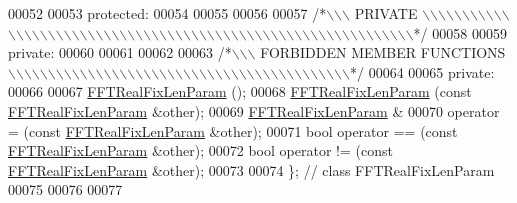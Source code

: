 \begin{DoxyCode}
00052 
00053 \textcolor{keyword}{protected}:
00054 
00055 
00056 
00057 \textcolor{comment}{/*\(\backslash\)\(\backslash\)\(\backslash\) PRIVATE \(\backslash\)\(\backslash\)\(\backslash\)\(\backslash\)\(\backslash\)\(\backslash\)\(\backslash\)\(\backslash\)\(\backslash\)\(\backslash\)\(\backslash\)\(\backslash\)\(\backslash\)\(\backslash\)\(\backslash\)\(\backslash\)\(\backslash\)\(\backslash\)\(\backslash\)\(\backslash\)\(\backslash\)\(\backslash\)\(\backslash\)\(\backslash\)\(\backslash\)\(\backslash\)\(\backslash\)\(\backslash\)\(\backslash\)\(\backslash\)\(\backslash\)\(\backslash\)\(\backslash\)\(\backslash\)\(\backslash\)\(\backslash\)\(\backslash\)\(\backslash\)\(\backslash\)\(\backslash\)\(\backslash\)\(\backslash\)\(\backslash\)\(\backslash\)\(\backslash\)\(\backslash\)\(\backslash\)\(\backslash\)\(\backslash\)\(\backslash\)\(\backslash\)\(\backslash\)\(\backslash\)\(\backslash\)\(\backslash\)\(\backslash\)\(\backslash\)\(\backslash\)\(\backslash\)\(\backslash\)\(\backslash\)\(\backslash\)*/}
00058 
00059 \textcolor{keyword}{private}:
00060 
00061 
00062 
00063 \textcolor{comment}{/*\(\backslash\)\(\backslash\)\(\backslash\) FORBIDDEN MEMBER FUNCTIONS \(\backslash\)\(\backslash\)\(\backslash\)\(\backslash\)\(\backslash\)\(\backslash\)\(\backslash\)\(\backslash\)\(\backslash\)\(\backslash\)\(\backslash\)\(\backslash\)\(\backslash\)\(\backslash\)\(\backslash\)\(\backslash\)\(\backslash\)\(\backslash\)\(\backslash\)\(\backslash\)\(\backslash\)\(\backslash\)\(\backslash\)\(\backslash\)\(\backslash\)\(\backslash\)\(\backslash\)\(\backslash\)\(\backslash\)\(\backslash\)\(\backslash\)\(\backslash\)\(\backslash\)\(\backslash\)\(\backslash\)\(\backslash\)\(\backslash\)\(\backslash\)\(\backslash\)\(\backslash\)\(\backslash\)\(\backslash\)\(\backslash\)*/}
00064 
00065 \textcolor{keyword}{private}:
00066 
00067                         \hyperlink{a00012}{FFTRealFixLenParam} ();
00068                         \hyperlink{a00012}{FFTRealFixLenParam} (\textcolor{keyword}{const} 
      \hyperlink{a00012}{FFTRealFixLenParam} &other);
00069     \hyperlink{a00012}{FFTRealFixLenParam} &
00070                         operator = (\textcolor{keyword}{const} \hyperlink{a00012}{FFTRealFixLenParam} &other);
00071     \textcolor{keywordtype}{bool}                operator == (\textcolor{keyword}{const} \hyperlink{a00012}{FFTRealFixLenParam} &other);
00072     \textcolor{keywordtype}{bool}                operator != (\textcolor{keyword}{const} \hyperlink{a00012}{FFTRealFixLenParam} &other);
00073 
00074 \};  \textcolor{comment}{// class FFTRealFixLenParam}
00075 
00076 
00077 

\end{DoxyCode}
